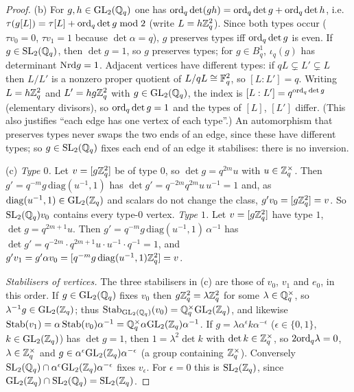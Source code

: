 \begin{proof}
(b) For $g,h\in\mathrm{GL}_2(\mathbb{Q}_q)$ one has $\mathrm{ord}_q\det(gh)=\mathrm{ord}_q\det g+\mathrm{ord}_q\det h$, i.e.\ $\tau(g[L])=\tau[L]+\mathrm{ord}_q\det g\bmod2$
(write $L=h\mathbb{Z}_q^2$). Since both types occur ($\tau v_0=0$, $\tau v_1=1$ because $\det\alpha=q$), $g$ preserves types iff $\mathrm{ord}_q\det g$ is even.
If $g\in\mathrm{SL}_2(\mathbb{Q}_q)$, then $\det g=1$, so $g$ preserves types; for $g\in B^1_q$, $\iota_q(g)$ has determinant $\mathrm{Nrd} g=1$.
Adjacent vertices have different types: if $qL\subsetneq L'\subsetneq L$ then $L/L'$ is a nonzero proper quotient of $L/qL\cong\mathbb{F}_q^2$,
so $[L:L']=q$. Writing $L=h\mathbb{Z}_q^2$ and $L'=hg\mathbb{Z}_q^2$ with $g\in\mathrm{GL}_2(\mathbb{Q}_q)$, the index is $[L:L']=q^{\mathrm{ord}_q\det g}$ (elementary divisors),
so $\mathrm{ord}_q\det g=1$ and the types of $[L]$, $[L']$ differ. (This also justifies ``each edge has one vertex of each type''.)
An automorphism that preserves types never swaps the two ends of an edge, since these have different types; so $g\in\mathrm{SL}_2(\mathbb{Q}_q)$ fixes
each end of an edge it stabilises: there is no inversion.

(c) \emph{Type $0$.} Let $v=[g\mathbb{Z}_q^2]$ be of type $0$, so $\det g=q^{2m}u$ with $u\in\mathbb{Z}_q^\times$. Then
$g'=q^{-m}g\,\mathrm{diag}(u^{-1},1)$ has $\det g'=q^{-2m}q^{2m}u\,u^{-1}=1$ and, as $\mathrm{diag}(u^{-1},1)\in\mathrm{GL}_2(\mathbb{Z}_q)$ and scalars do not change the
class, $g'v_0=[g\mathbb{Z}_q^2]=v$. So $\mathrm{SL}_2(\mathbb{Q}_q)v_0$ contains every type-$0$ vertex.
\emph{Type $1$.} Let $v=[g\mathbb{Z}_q^2]$ have type $1$, $\det g=q^{2m+1}u$. Then
$g'=q^{-m}g\,\mathrm{diag}(u^{-1},1)\,\alpha^{-1}$ has $\det g'=q^{-2m}\cdot q^{2m+1}u\cdot u^{-1}\cdot q^{-1}=1$, and
$g'v_1=g'\alpha v_0=[q^{-m}g\,\mathrm{diag}(u^{-1},1)\mathbb{Z}_q^2]=v$.

\emph{Stabilisers of vertices.} The three stabilisers in (c) are those of $v_0$, $v_1$ and $e_0$, in this order. If $g\in\mathrm{GL}_2(\mathbb{Q}_q)$ fixes $v_0$ then $g\mathbb{Z}_q^2=\lambda\mathbb{Z}_q^2$ for some $\lambda\in\mathbb{Q}_q^\times$, so
$\lambda^{-1}g\in\mathrm{GL}_2(\mathbb{Z}_q)$; thus $\operatorname{Stab}_{\mathrm{GL}_2(\mathbb{Q}_q)}(v_0)=\mathbb{Q}_q^\times\mathrm{GL}_2(\mathbb{Z}_q)$, and likewise $\operatorname{Stab}(v_1)=\alpha\operatorname{Stab}(v_0)\alpha^{-1}=\mathbb{Q}_q^\times\alpha\mathrm{GL}_2(\mathbb{Z}_q)\alpha^{-1}$.
If $g=\lambda\alpha^{\epsilon}k\alpha^{-\epsilon}$ ($\epsilon\in\{0,1\}$, $k\in\mathrm{GL}_2(\mathbb{Z}_q)$) has $\det g=1$, then
$1=\lambda^2\det k$ with $\det k\in\mathbb{Z}_q^\times$, so $2\mathrm{ord}_q\lambda=0$, $\lambda\in\mathbb{Z}_q^\times$ and $g\in\alpha^{\epsilon}\mathrm{GL}_2(\mathbb{Z}_q)\alpha^{-\epsilon}$
(a group containing $\mathbb{Z}_q^\times$). Conversely $\mathrm{SL}_2(\mathbb{Q}_q)\cap\alpha^\epsilon\mathrm{GL}_2(\mathbb{Z}_q)\alpha^{-\epsilon}$ fixes $v_\epsilon$. For $\epsilon=0$ this is
$\mathrm{SL}_2(\mathbb{Z}_q)$, since $\mathrm{GL}_2(\mathbb{Z}_q)\cap\mathrm{SL}_2(\mathbb{Q}_q)=\mathrm{SL}_2(\mathbb{Z}_q)$.


\end{proof}
